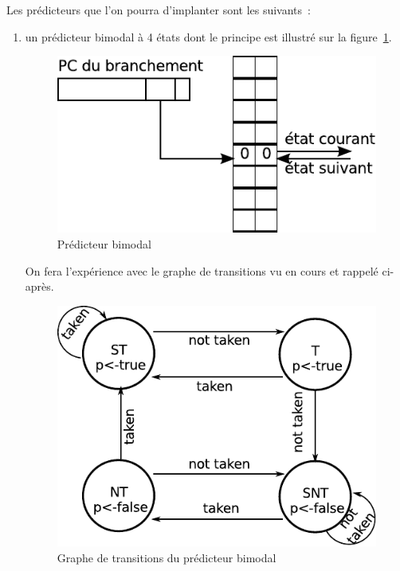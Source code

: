 \documentclass[a4paper]{article}
\begin{document}
Les prédicteurs que l'on pourra d'implanter sont les suivants~:
\begin{enumerate}
\item un prédicteur bimodal à 4 états dont le principe est illustré
      sur la figure~\ref{2-bits}.
      \begin{figure}[hbt]\center\leavevmode
      \includegraphics[scale=1]{2-bits}
      \caption{Prédicteur bimodal}
      \label{2-bits}
      \end{figure}
      
      On fera l'expérience avec le graphe de transitions vu en cours et rappelé ci-après.
      \begin{figure}[htb]
      \center\includegraphics[scale=.6]{2bg1}
      \caption{\label{graphes}Graphe de transitions du prédicteur bimodal}
      \end{figure}


\end{enumerate}
\end{document}
